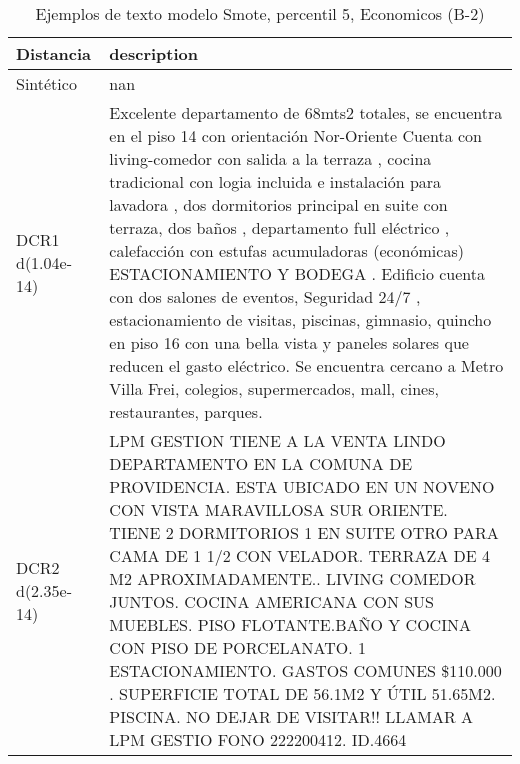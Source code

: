 \begin{table}[H]
\centering
\fontsize{10}{14}\selectfont
\caption{Ejemplos de texto modelo Smote, percentil 5, Economicos (B-2)}
\label{table-example-economicos-b-2-smote-enc-5p-text}
\begin{tabular}{|l|m{35em}|}
\hline
\rowcolor[gray]{0.8}
Distancia & description \\
\hline Sintético & nan \\
\hline DCR1 d(1.04e-14) & Excelente departamento de 68mts2 totales,  se encuentra en el piso 14  con orientaci\'on Nor-Oriente     Cuenta con living-comedor con salida a la terraza , cocina tradicional con logia incluida e instalaci\'on para lavadora , dos dormitorios  principal en suite con terraza, dos ba\~nos , departamento full el\'ectrico , calefacci\'on con estufas acumuladoras  (econ\'omicas) ESTACIONAMIENTO Y BODEGA .    Edificio cuenta con dos salones de eventos, Seguridad 24/7 , estacionamiento de visitas, piscinas, gimnasio, quincho en piso 16 con una bella vista y paneles solares que reducen el gasto el\'ectrico.    Se encuentra cercano a Metro Villa Frei, colegios, supermercados,  mall, cines, restaurantes, parques. \\
\hline DCR2 d(2.35e-14) & LPM GESTION TIENE A LA VENTA LINDO DEPARTAMENTO EN LA COMUNA DE PROVIDENCIA. ESTA UBICADO EN UN NOVENO CON VISTA MARAVILLOSA SUR ORIENTE. TIENE 2 DORMITORIOS 1 EN SUITE OTRO PARA CAMA DE 1 1/2 CON VELADOR.  TERRAZA DE 4 M2 APROXIMADAMENTE..  LIVING COMEDOR JUNTOS. COCINA AMERICANA CON SUS MUEBLES. PISO FLOTANTE.BA\~NO Y COCINA CON PISO DE PORCELANATO.  1 ESTACIONAMIENTO. GASTOS COMUNES \$110.000 . SUPERFICIE TOTAL DE 56.1M2 Y \'UTIL 51.65M2. PISCINA. NO DEJAR DE VISITAR!!  LLAMAR A LPM GESTIO FONO 222200412. ID.4664 \\
\hline
\end{tabular}
\end{table}

